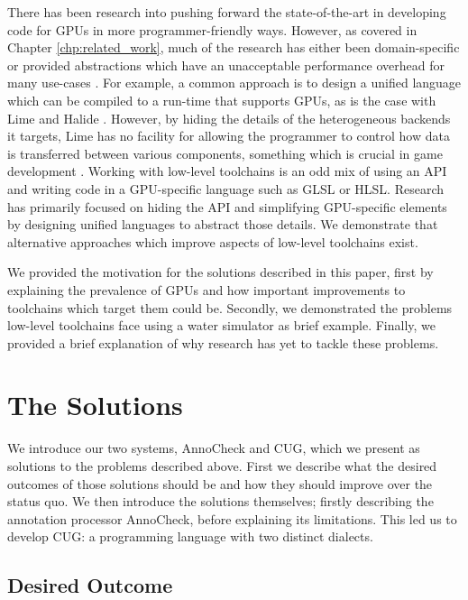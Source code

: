 \documentclass[a4paper,12pt,twoside,openright]{report}
\begin{document}
There has been research into pushing forward the state-of-the-art in developing
code for GPUs in more programmer-friendly ways. However, as covered in Chapter
\ref{chp:related_work}, much of the research has either been domain-specific or
provided abstractions which have an unacceptable performance overhead for many
use-cases \cite{TODO}. For example, a common approach is to design a unified
language which can be compiled to a run-time that supports GPUs, as is the case
with Lime and Halide \cite{Lime2010} \cite{Halide}. However, by hiding the
details of the heterogeneous backends it targets, Lime has no facility for
allowing the programmer to control how data is transferred between various
components, something which is crucial in game development \cite{TODO}. Working
with low-level toolchains is an odd mix of using an API and writing code in a
GPU-specific language such as GLSL or HLSL. Research has primarily focused on
hiding the API and simplifying GPU-specific elements by designing unified
languages to abstract those details. We demonstrate that alternative approaches
which improve aspects of low-level toolchains exist.

We provided the motivation for the solutions described in this paper, first by
explaining the prevalence of GPUs and how important improvements to toolchains
which target them could be. Secondly, we demonstrated the problems low-level
toolchains face using a water simulator as brief example. Finally, we provided
a brief explanation of why research has yet to tackle these problems.

\section{The Solutions}

\label{sec:solutions_introduction}

We introduce our two systems, AnnoCheck and CUG, which we present as solutions
to the problems described above. First we describe what the desired outcomes of
those solutions should be and how they should improve over the status quo. We
then introduce the solutions themselves; firstly describing the annotation
processor AnnoCheck, before explaining its limitations. This led us to develop
CUG: a programming language with two distinct dialects.

\subsection{Desired Outcome}
\end{document}
